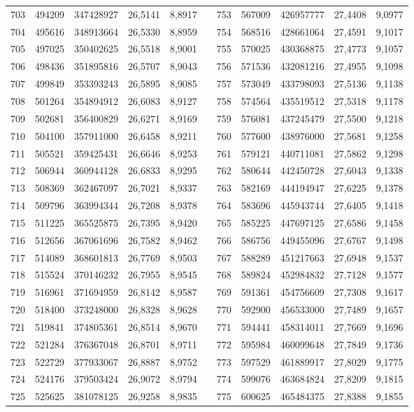 \begin{longtable}{rrrrrrrrrrr}
703&494209&347428927&26,5141&8,8917&&753&567009&426957777&27,4408&9,0977\\
704&495616&348913664&26,5330&8,8959&&754&568516&428661064&27,4591&9,1017\\
705&497025&350402625&26,5518&8,9001&&755&570025&430368875&27,4773&9,1057\\
706&498436&351895816&26,5707&8,9043&&756&571536&432081216&27,4955&9,1098\\
707&499849&353393243&26,5895&8,9085&&757&573049&433798093&27,5136&9,1138\\
708&501264&354894912&26,6083&8,9127&&758&574564&435519512&27,5318&9,1178\\
709&502681&356400829&26,6271&8,9169&&759&576081&437245479&27,5500&9,1218\\
710&504100&357911000&26,6458&8,9211&&760&577600&438976000&27,5681&9,1258\\
711&505521&359425431&26,6646&8,9253&&761&579121&440711081&27,5862&9,1298\\
712&506944&360944128&26,6833&8,9295&&762&580644&442450728&27,6043&9,1338\\
713&508369&362467097&26,7021&8,9337&&763&582169&444194947&27,6225&9,1378\\
714&509796&363994344&26,7208&8,9378&&764&583696&445943744&27,6405&9,1418\\
715&511225&365525875&26,7395&8,9420&&765&585225&447697125&27,6586&9,1458\\
716&512656&367061696&26,7582&8,9462&&766&586756&449455096&27,6767&9,1498\\
717&514089&368601813&26,7769&8,9503&&767&588289&451217663&27,6948&9,1537\\
718&515524&370146232&26,7955&8,9545&&768&589824&452984832&27,7128&9,1577\\
719&516961&371694959&26,8142&8,9587&&769&591361&454756609&27,7308&9,1617\\
720&518400&373248000&26,8328&8,9628&&770&592900&456533000&27,7489&9,1657\\
721&519841&374805361&26,8514&8,9670&&771&594441&458314011&27,7669&9,1696\\
722&521284&376367048&26,8701&8,9711&&772&595984&460099648&27,7849&9,1736\\
723&522729&377933067&26,8887&8,9752&&773&597529&461889917&27,8029&9,1775\\
724&524176&379503424&26,9072&8,9794&&774&599076&463684824&27,8209&9,1815\\
725&525625&381078125&26,9258&8,9835&&775&600625&465484375&27,8388&9,1855\\

\end{longtable}
